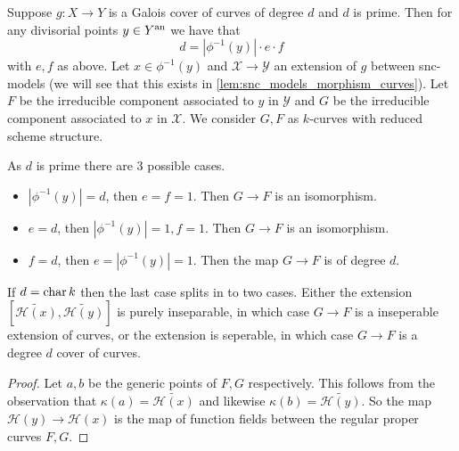 \begin{remark}\label{rem:balancing_galois_cover}
	Suppose $g:X \to Y$ is a Galois cover of curves of degree $d$ and $d$ is prime.
	Then for any divisorial points $y \in Y{}^{\text{an}}$ we have that \[
		d = |\phi^{-1}(y)| \cdot e \cdot f
	\] 
	with $e, f$ as above. 
	Let $x \in \phi^{-1}(y)$ and $\mathscr X \to \mathscr Y$ an extension of $g$ between snc-models (we will see that this exists in \cref{lem:snc_models_morphism_curves}).
	Let $F$ be the irreducible component associated to $y$ in $\mathscr Y$ and $G$ be the irreducible component associated to $x$ in  $\mathscr X$. 
	We consider $G, F$ as $k$-curves with reduced scheme structure. 

	As $d$ is prime there are 3 possible cases. 
	\begin{itemize}
		\item $|\phi^{-1}(y)| = d$, then $e = f = 1$.  
			Then $G \to F$ is an isomorphism. 
		\item $e = d$, then $|\phi^{-1}(y)| = 1, f = 1$. 
			Then $G \to F$ is an isomorphism. 
		\item $f = d$, then $e = |\phi^{-1}(y)| = 1$. 
			Then the map $G \to F$ is of degree $d$. 
	\end{itemize}
	If $d = \operatorname{char} k$ then the last case splits in to two cases. 
	Either the extension $\left[\widetilde{\mathcal{H} (x)}, \widetilde {\mathcal{H} (y)}\right]$ is purely inseparable, in which case $G \to F$ is a inseperable extension of curves, or the extension is seperable, in which case $G \to F$ is a degree $d$ cover of curves.
\end{remark}
\begin{proof}
	Let $a, b$ be the generic points of $F, G$ respectively. 
	This follows from the observation that $\kappa(a) = \widetilde{\mathcal{H} (x)}$ and likewise $\kappa(b) = \widetilde{\mathcal{H} (y)}$.
	So the map $\mathcal{H} (y) \to \mathcal{H} (x)$ is the map of function fields between the regular proper curves $F, G$. 
\end{proof}

